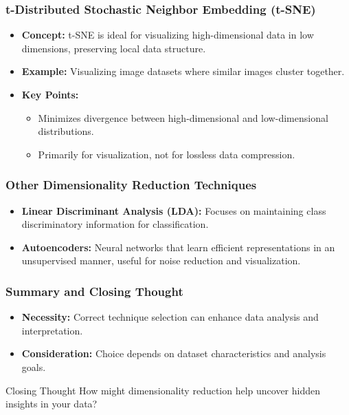 \documentclass[aspectratio=169]{beamer}
\begin{document}
\begin{frame}[fragile]
    \frametitle{t-Distributed Stochastic Neighbor Embedding (t-SNE)}
    \begin{itemize}
        \item \textbf{Concept:} t-SNE is ideal for visualizing high-dimensional data in low dimensions, preserving local data structure.
        \item \textbf{Example:} Visualizing image datasets where similar images cluster together.
        \item \textbf{Key Points:}
        \begin{itemize}
            \item Minimizes divergence between high-dimensional and low-dimensional distributions.
            \item Primarily for visualization, not for lossless data compression.
        \end{itemize}
    \end{itemize}
\end{frame}

\begin{frame}[fragile]
    \frametitle{Other Dimensionality Reduction Techniques}
    \begin{itemize}
        \item \textbf{Linear Discriminant Analysis (LDA):} Focuses on maintaining class discriminatory information for classification.
        \item \textbf{Autoencoders:} Neural networks that learn efficient representations in an unsupervised manner, useful for noise reduction and visualization.
    \end{itemize}
\end{frame}

\begin{frame}[fragile]
    \frametitle{Summary and Closing Thought}
    \begin{itemize}
        \item \textbf{Necessity:} Correct technique selection can enhance data analysis and interpretation.
        \item \textbf{Consideration:} Choice depends on dataset characteristics and analysis goals.
    \end{itemize}
    \begin{block}{Closing Thought}
        How might dimensionality reduction help uncover hidden insights in your data?
    \end{block}
\end{frame}
\end{document}
